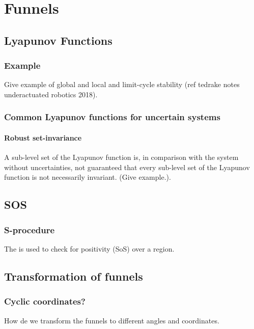 \chapter{Funnels}


\section{}

\section{Lyapunov Functions}

\subsection{Example}
Give example of global and local and limit-cycle stability (ref tedrake notes
underactuated robotics 2018).

\subsection{Common Lyapunov functions for uncertain systems}
\subsubsection{Robust set-invariance}

A sub-level set of the Lyapunov function is, in comparison with the system
without uncertainties, not guaranteed that every sub-level set of the Lyapunov
function is not necessarily invariant. (Give example.).

\section{SOS}

\subsection{S-procedure}

The  is used to check for positivity (SoS) over a region.

\section{Transformation of funnels}

\subsection{Cyclic coordinates?}

How de we transform the funnels to different angles and coordinates.